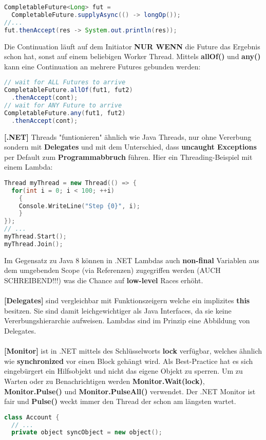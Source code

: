 \documentclass[8pt]{extarticle}
\let\oldtextbf\textbf
\renewcommand{\textbf}{\tiny\oldtextbf}
\begin{document}
\begin{multicols*}{5}
\begin{lstlisting}[language=java]
CompletableFuture<Long> fut = 
  CompletableFuture.supplyAsync(() -> longOp());
//...
fut.thenAccept(res -> System.out.println(res));
\end{lstlisting}
Die Continuation läuft auf dem Initiator \textbf{NUR WENN} die Future das Ergebnis schon hat, sonst auf einem beliebigen Worker Thread. Mittels \textbf{allOf()} und \textbf{any()} kann eine Continuation an mehrere Futures gebunden werden:
\begin{lstlisting}[language=java]
// wait for ALL Futures to arrive
CompletableFuture.allOf(fut1, fut2)
  .thenAccept(cont);
// wait for ANY Future to arrive
CompletableFuture.any(fut1, fut2)
  .thenAccept(cont);
\end{lstlisting}
\textbf{[.NET]} Threads "funtionieren" ähnlich wie Java Threads, nur ohne Vererbung sondern mit \textbf{Delegates} und mit dem Unterschied, dass \textbf{uncaught Exceptions} per Default zum \textbf{Programmabbruch} führen. Hier ein Threading-Beispiel mit einem Lambda:
\begin{lstlisting}[language=c++]
Thread myThread = new Thread(() => {
  for(int i = 0; i < 100; ++i)
    {
    Console.WriteLine("Step {0}", i);
    }
});
// ...
myThread.Start();
myThread.Join();
\end{lstlisting}
Im Gegensatz zu Java 8 können in .NET Lambdas auch \textbf{non-final} Variablen aus dem umgebenden Scope (via Referenzen) zugegriffen werden (AUCH SCHREIBEND!!!) was die Chance auf \textbf{low-level} Races erhöht.\\\\
\textbf{[Delegates]} sind vergleichbar mit Funktionszeigern welche ein implizites \textbf{this} besitzen. Sie sind damit leichgewichtiger als Java Interfaces, da sie keine Vererbungshierarchie aufweisen. Lambdas sind im Prinzip eine Abbildung von Delegates.\\\\
\textbf{[Monitor]} ist in .NET mittels des Schlüsselworts \textbf{lock} verfügbar, welches ähnlich wie \textbf{synchronized} vor einen Block gehängt wird. Als Best-Practice hat es sich eingebürgert ein Hilfsobjekt und nicht das eigene Objekt zu sperren. Um zu Warten oder zu Benachrichtigen werden \textbf{Monitor.Wait(lock)}, \textbf{Monitor.Pulse()} und \textbf{Monitor.PulseAll()} verwendet. Der .NET Monitor ist fair und \textbf{Pulse()} weckt immer den Thread der schon am längsten wartet.
\begin{lstlisting}[language=c++]
class Account {
  // ...
  private object syncObject = new object();


\end{lstlisting}
\end{multicols*}
\end{document}
